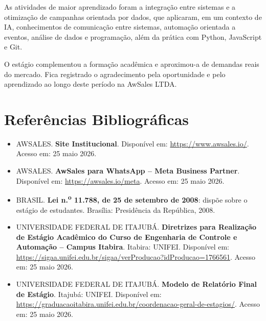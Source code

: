 \documentclass[12pt,a4paper,oneside]{article}
\begin{document}
As atividades de maior aprendizado foram a integração entre sistemas e a otimização de campanhas orientada por dados, que aplicaram, em um contexto de IA, conhecimentos de comunicação entre sistemas, automação orientada a eventos, análise de dados e programação, além da prática com Python, JavaScript e Git.

O estágio complementou a formação acadêmica e aproximou-a de demandas reais do mercado. Fica registrado o agradecimento pela oportunidade e pelo aprendizado ao longo deste período na AwSales LTDA.

\section{Referências Bibliográficas}

\begin{itemize}[leftmargin=2em]
  \item AWSALES. \textbf{Site Institucional}. Disponível em: \url{https://www.awsales.io/}. Acesso em: 25 maio 2026.
  \item AWSALES. \textbf{AwSales para WhatsApp -- Meta Business Partner}. Disponível em: \url{https://awsales.io/meta}. Acesso em: 25 maio 2026.
  \item BRASIL. \textbf{Lei n.\textsuperscript{o} 11.788, de 25 de setembro de 2008}: dispõe sobre o estágio de estudantes. Brasília: Presidência da República, 2008.
  \item UNIVERSIDADE FEDERAL DE ITAJUBÁ. \textbf{Diretrizes para Realização de Estágio Acadêmico do Curso de Engenharia de Controle e Automação -- Campus Itabira}. Itabira: UNIFEI. Disponível em: \url{https://sigaa.unifei.edu.br/sigaa/verProducao?idProducao=1766561}. Acesso em: 25 maio 2026.
  \item UNIVERSIDADE FEDERAL DE ITAJUBÁ. \textbf{Modelo de Relatório Final de Estágio}. Itajubá: UNIFEI. Disponível em: \url{https://graduacaoitabira.unifei.edu.br/coordenacao-geral-de-estagios/}. Acesso em: 25 maio 2026.
\end{itemize}
\end{document}
